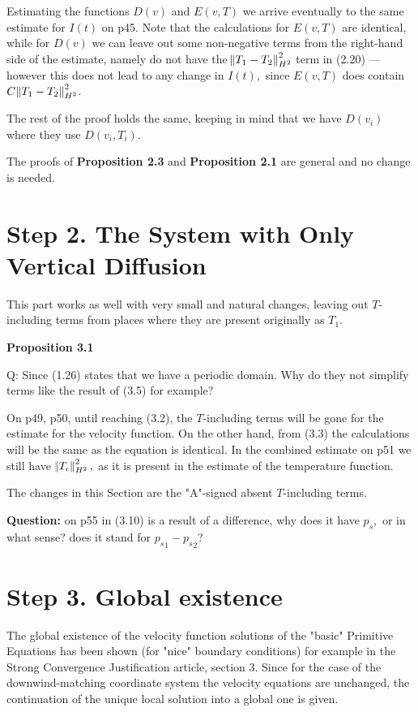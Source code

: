 \documentclass[11pt]{article}
\begin{document}
Estimating the functions $D(v)$ and $E(v,T)$ we arrive eventually to the same estimate for $I(t)$ on p45. Note that the calculations for $E(v,T)$ are identical, while for $D(v)$ we can leave out some non-negative terms from the right-hand side of the estimate, namely do not have the $\norm{T_1 - T_2}_{H^2}^2$ term in (2.20) --- however this does not lead to any change in $I(t),$ since $E(v,T)$ does contain $C \norm{T_1 - T_2}_{H^2}^2$.

The rest of the proof holds the same, keeping in mind that we have $D(v_i)$ where they use $D(v_i, T_i).$

The proofs of \textbf{Proposition 2.3} and \textbf{Proposition 2.1} are general and no change is needed.

\section{Step 2. The System with Only Vertical Diffusion}

This part works as well with very small and natural changes, leaving out $T$-including terms from places where they are present originally as $T_1.$

\textbf{Proposition 3.1}

Q: Since (1.26) states that we have a periodic domain. Why do they not simplify terms like the result of (3.5) for example?

On p49, p50, until reaching (3.2), the $T$-including terms will be gone for the estimate for the velocity function. On the other hand, from (3.3) the calculations will be the same as the equation is identical. In the combined estimate on p51 we still have $\norm{T_\epsilon}_{H^2}^2,$ as it is present in the estimate of the temperature function.

The changes in this Section are the "A"-signed absent $T$-including terms.

\textbf{Question:} on p55 in (3.10) is a result of a difference, why does it have $p_s,$ or in what sense? does it stand for ${p_s}_1-{p_s}_2$?

\section{Step 3. Global existence}

The global existence of the velocity function solutions of the "basic" Primitive Equations has been shown (for "nice" boundary conditions) for example in the Strong Convergence Justification article, section 3.
Since for the case of the downwind-matching coordinate system the velocity equations are unchanged, the continuation of the unique local solution into a global one is given.
\end{document}
